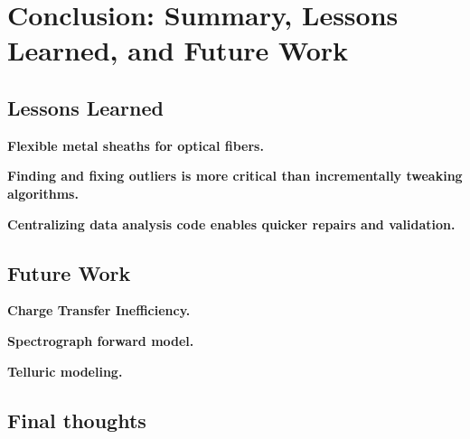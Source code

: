 \chapter{Conclusion: Summary, Lessons Learned, and Future Work}\label{chapter:conclusion}





\section{Lessons Learned}

\textbf{Flexible metal sheaths for optical fibers.}

\textbf{Finding and fixing outliers is more critical than incrementally tweaking algorithms.}

\textbf{Centralizing data analysis code enables quicker repairs and validation.}




\section{Future Work}

\textbf{Charge Transfer Inefficiency.}

\textbf{Spectrograph forward model.}

\textbf{Telluric modeling.}


\section{Final thoughts}